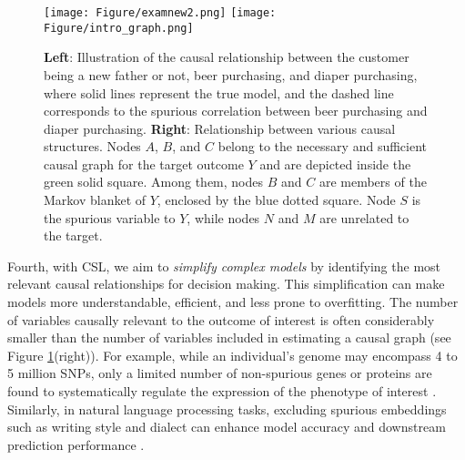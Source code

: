 \begin{figure}[!t] 
\centering 
  \texttt{[image: Figure/examnew2.png]} 
  \texttt{[image: Figure/intro\_graph.png]} 
\caption{\textbf{Left}: Illustration of the causal relationship between the customer being a new father or not, beer purchasing, and diaper purchasing, where solid lines represent the true model, and the dashed line corresponds to the spurious correlation between beer purchasing and diaper purchasing. \textbf{Right}: Relationship between various causal structures. Nodes $A$, $B$, and $C$ belong to the necessary and sufficient causal graph for the target outcome $Y$ and are depicted inside the green solid square. Among them, nodes $B$ and $C$ are members of the Markov blanket of $Y$, enclosed by the blue dotted square. Node $S$ is the spurious variable to $Y$, while nodes $N$ and $M$ are unrelated to the target.} \label{fig:0}
\end{figure}  

Fourth, with \acrshort{CSL}, we aim to \textit{simplify complex models} by identifying the most relevant causal relationships for decision making. This simplification can make models more understandable, efficient, and less prone to overfitting. The number of variables causally relevant to the outcome of interest is often considerably smaller than the number of variables included in estimating a causal graph (see  Figure \ref{fig:0}(right)). For example, while an individual's genome may encompass 4 to 5 million \acrfull{SNPs}, only a limited number of non-spurious genes or proteins are found to systematically regulate the expression of the phenotype of interest \citep[e.g.,][]{chakrabortty2018inference}. Similarly, in natural language processing tasks, excluding spurious embeddings such as writing style and dialect can enhance model accuracy and downstream prediction performance \citep[e.g.,][]{feder2021causal}. %


